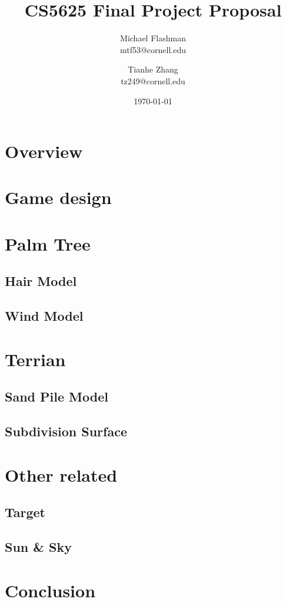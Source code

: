 \documentclass[11pt]{article}
\begin{document}
\title{CS5625 Final Project Proposal}
\author{Michael Flashman \\ mtf53@cornell.edu \and Tianhe Zhang \\ tz249@cornell.edu\\}
\date{\today}
\maketitle


\section{Overview}

\section{Game design}

\section{Palm Tree}
\subsection{Hair Model}
\subsection{Wind Model}

\section{Terrian}
\subsection{Sand Pile Model}
\subsection{Subdivision Surface}

\section{Other related}
\subsection{Target}
\subsection{Sun \& Sky}

\section{Conclusion}
\end{document}
